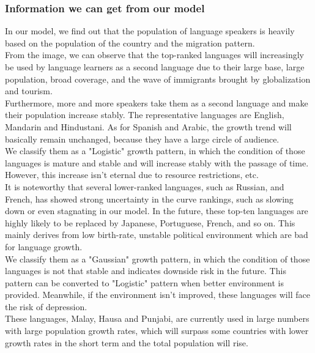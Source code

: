\documentclass{mcmthesis}
\begin{document}
\subsubsection{Information we can get from our model}
\hspace*{8mm}In our model, we find out that the population of language speakers is heavily based on the population of the country and the migration pattern. \\
\hspace*{8mm}From the image, we can observe that the top-ranked languages will increasingly be used by language learners as a second language due to their large base, large population, broad coverage, and the wave of immigrants brought by globalization and tourism.\\ \hspace*{8mm}Furthermore, more and more speakers take them as a second language and make their population increase stably. The representative languages are English, Mandarin and Hindustani. As for Spanish and Arabic, the growth trend will basically remain unchanged, because they have a large circle of audience.\\
\hspace*{8mm}We classify them as a "Logistic" growth pattern, in which the condition of those languages is mature and stable and will increase stably with the passage of time. However, this increase isn't eternal due to resource restrictions, etc.\\
\hspace*{8mm}It is noteworthy that several lower-ranked languages, such as Russian, and French, has showed strong uncertainty in the curve rankings, such as slowing down or even stagnating in our model. In the future, these top-ten languages are highly likely to be replaced by Japanese, Portuguese, French, and so on. This mainly derives from low birth-rate, unstable political environment which are bad for language growth.\\
\hspace*{8mm}We classify them as a "Gaussian" growth pattern, in which the condition of those languages is not that stable and indicates downside risk in the future. This pattern can be converted to "Logistic" pattern when better environment is provided. Meanwhile, if the environment isn't improved, these languages will face the risk of depression.\\
\hspace*{8mm}These languages, Malay, Hausa and Punjabi, are currently used in large numbers with large population growth rates, which will surpass some countries with lower growth rates in the short term and the total population will rise.\\ 
\end{document}
